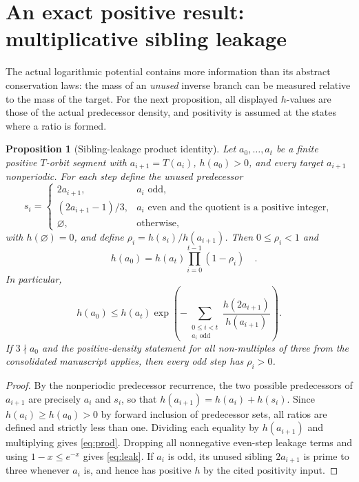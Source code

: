 \documentclass[11pt,a4paper]{article}
\newtheorem{proposition}[theorem]{Proposition}
\begin{document}
\section{An exact positive result: multiplicative sibling leakage}
The actual logarithmic potential contains more information than its
abstract conservation laws: the mass of an \emph{unused} inverse
branch can be measured relative to the mass of the target.
For the next proposition, all displayed $h$-values are those of the
actual predecessor density, and positivity is assumed at the states
where a ratio is formed.
\begin{proposition}[Sibling-leakage product identity]
\label{prop:leak}
Let $a_0,\ldots,a_t$ be a finite positive $T$-orbit segment with
$a_{i+1}=T(a_i)$, $h(a_0)>0$, and every target $a_{i+1}$
nonperiodic. For each step define the unused predecessor
\[
 s_i=\begin{cases}
 2a_{i+1}, & a_i\text{ odd},\\
 (2a_{i+1}-1)/3, & a_i\text{ even and the quotient is a
 positive integer},\\
 \varnothing,& \text{otherwise},
 \end{cases}
\]
with $h(\varnothing)=0$, and define
$\rho_i=h(s_i)/h(a_{i+1})$. Then $0\le\rho_i<1$ and
\begin{equation}\label{eq:prod}
 \boxed{\quad h(a_0)=h(a_t)\prod_{i=0}^{t-1}(1-\rho_i)\quad}.
\end{equation}
In particular,
\begin{equation}\label{eq:leak}
 \boxed{\quad h(a_0)\le h(a_t)
 \exp\left(-\sum_{\substack{0\le i<t\\a_i\text{ odd}}}
 \frac{h(2a_{i+1})}{h(a_{i+1})}\right).\quad}
\end{equation}
If $3\nmid a_0$ and the positive-density statement for all
non-multiples of three from the consolidated manuscript applies,
then every odd step has $\rho_i>0$.
\end{proposition}
\begin{proof}
By the nonperiodic predecessor recurrence, the two possible
predecessors of $a_{i+1}$ are precisely $a_i$ and $s_i$,
so that $h(a_{i+1})=h(a_i)+h(s_i)$. Since $h(a_i)\ge h(a_0)>0$
by forward inclusion of predecessor sets, all ratios are defined
and strictly less than one. Dividing each equality by
$h(a_{i+1})$ and multiplying gives \eqref{eq:prod}.
Dropping all nonnegative even-step leakage terms and using
$1-x\le e^{-x}$ gives \eqref{eq:leak}. If $a_i$ is odd, its
unused sibling $2a_{i+1}$ is prime to three whenever $a_i$ is,
and hence has positive $h$ by the cited positivity input.
\end{proof}
\end{document}
